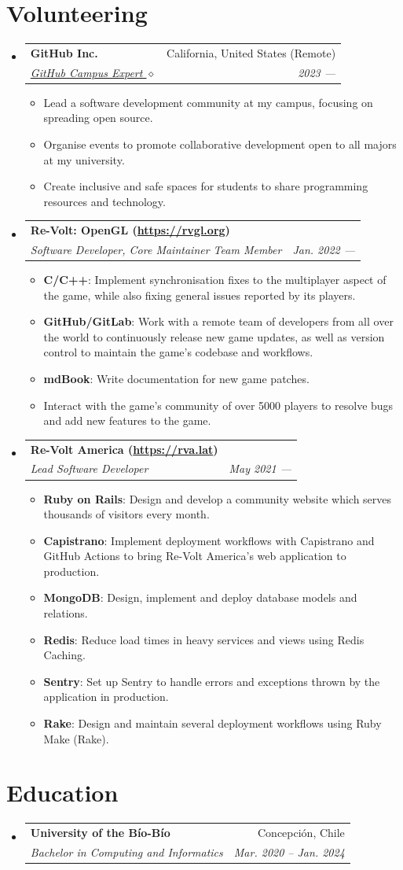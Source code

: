 \documentclass[letterpaper,11pt]{article}
\makeatletter
\newcommand{\resumeItem}[2]{
	\item\small{
		\textbf{#1}{: #2 \vspace{-2pt}}
	}
}
\newcommand{\resumeSubheading}[4]{
	\vspace{-1pt}\item
	\begin{tabular*}{0.97\textwidth}[t]{l@{\extracolsep{\fill}}r}
		\textbf{#1} & #2 \\
		\textit{\small#3} & \textit{\small #4} \\
	\end{tabular*}\vspace{-5pt}
}
\newcommand{\resumeSubHeadingListStart}{\begin{itemize}[leftmargin=*]}
\newcommand{\resumeSubHeadingListEnd}{\end{itemize}}
\newcommand{\resumeItemListStart}{\begin{itemize}}
\newcommand{\resumeItemListEnd}{\end{itemize}\vspace{-5pt}}
\makeatother
\begin{document}
	\section{Volunteering}
	\resumeSubHeadingListStart
	\resumeSubheading
	{GitHub Inc.}{California, United States (Remote)}
	{\href{https://githubcampus.expert/BGMP}{GitHub Campus Expert $\diamond$}}{2023 ---}
	\resumeItemListStart
	\item{Lead a software development community at my campus, focusing on spreading open source.}
	\item{Organise events to promote collaborative development open to all majors at my university.}
	\item{Create inclusive and safe spaces for students to share programming resources and technology.}
	\resumeItemListEnd
	\resumeSubheading
	{Re-Volt: OpenGL (\textnormal{\url{https://rvgl.org}})}{}
	{Software Developer, Core Maintainer Team Member}{Jan. 2022 ---}
	\resumeItemListStart
	\resumeItem{C/C++}{Implement synchronisation fixes to the multiplayer aspect of the game, while also fixing general issues reported by its players.}
	\resumeItem{GitHub/GitLab}{Work with a remote team of developers from all over the world to continuously release new game updates, as well as version control to maintain the game's codebase and workflows.}
	\resumeItem{mdBook}{Write documentation for new game patches.}
	\item{Interact with the game's community of over 5000 players to resolve bugs and add new features to the game.}
	\resumeItemListEnd
	\resumeSubheading
	{Re-Volt America (\textnormal{\url{https://rva.lat}})}{}
	{Lead Software Developer}{May 2021 ---}
	\resumeItemListStart
	\resumeItem{Ruby on Rails}{Design and develop a community website which serves thousands of visitors every month.}
	\resumeItem{Capistrano}{Implement deployment workflows with Capistrano and GitHub Actions to bring Re-Volt America's web application to production.}
	\resumeItem{MongoDB}{Design, implement and deploy database models and relations.}
	\resumeItem{Redis}{Reduce load times in heavy services and views using Redis Caching.}
	\resumeItem{Sentry}{Set up Sentry to handle errors and exceptions thrown by the application in production.}
	\resumeItem{Rake}{Design and maintain several deployment workflows using Ruby Make (Rake).}
	\resumeItemListEnd
	\resumeSubHeadingListEnd
	
	\section{Education}
	\resumeSubHeadingListStart
	\resumeSubheading
	{University of the Bío-Bío}{Concepción, Chile}
	{Bachelor in Computing and Informatics}{Mar. 2020 -- Jan. 2024}
	\resumeSubHeadingListEnd
	
\end{document}
